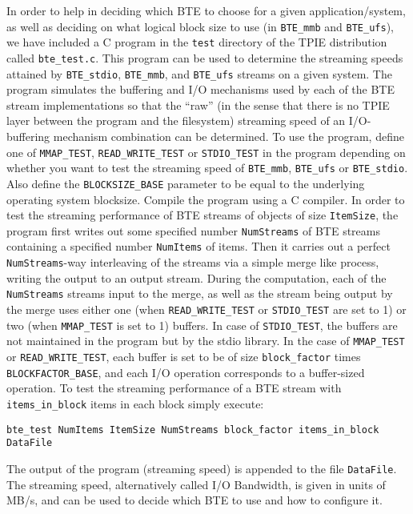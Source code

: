 In order to help in deciding which BTE to choose for a given
application/system, as well as deciding on what logical block size to use
(in \verb|BTE_mmb| and \verb|BTE_ufs|), we have included a C program in the
\verb|test| directory of the TPIE distribution called \verb|bte_test.c|.
This program can be used to determine the streaming speeds attained by
\verb|BTE_stdio|, \verb|BTE_mmb|, and \verb|BTE_ufs| streams on a given
system. The program simulates the buffering and I/O mechanisms used by each
of the BTE stream implementations so that the ``raw'' (in the sense that
there is no TPIE layer between the program and the filesystem) streaming
speed of an I/O-buffering mechanism combination can be determined. To use
the program, define one of \verb|MMAP_TEST|,
\verb|READ_WRITE_TEST| or \verb|STDIO_TEST|
in the program depending on whether you want to test the streaming speed of
\verb|BTE_mmb|, \verb|BTE_ufs| or \verb|BTE_stdio|. Also define the
\verb|BLOCKSIZE_BASE| parameter to be equal to the underlying operating
system blocksize. Compile the program using
a C compiler. In order to test the streaming performance of BTE streams of
objects of size \verb|ItemSize|, the program first writes out some
specified number \verb|NumStreams| of BTE streams containing a specified
number \verb|NumItems| of items. Then it carries out a perfect
\verb|NumStreams|-way interleaving of the streams via a simple merge like
process, writing the output to an output stream. During the computation,
each of the \verb|NumStreams| streams input to the merge, as well as the
stream being output by the merge uses either one (when
\verb|READ_WRITE_TEST| or \verb|STDIO_TEST| are set to 1) or two (when
\verb|MMAP_TEST| is set to 1) buffers.  In case of \verb|STDIO_TEST|, the
buffers are not maintained in the program but by the stdio library. In the
case of \verb|MMAP_TEST| or \verb|READ_WRITE_TEST|, each buffer is set to
be of size \verb|block_factor| times \verb|BLOCKFACTOR_BASE|, and each I/O
operation corresponds to a buffer-sized operation. To test the streaming
performance of a BTE stream with \verb|items_in_block| items in each block
simply execute:
\begin{verbatim}
bte_test NumItems ItemSize NumStreams block_factor items_in_block DataFile 
\end{verbatim}
The output of the program (streaming speed) is appended to the file
\verb|DataFile|. The streaming speed, alternatively called I/O Bandwidth,
is given in units of MB/s, and can be used to decide which BTE to use and
how to configure it.

